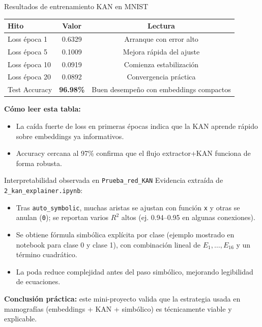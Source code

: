 \documentclass[aspectratio=169,spanish]{beamer}
\begin{document}
\begin{frame}{Resultados de entrenamiento KAN en MNIST}
  \small
  \begin{tabular}{@{}lcc@{}}
    \toprule
    Hito & Valor & Lectura \\
    \midrule
    Loss época 1  & 0.6329 & Arranque con error alto \\
    Loss época 5  & 0.1009 & Mejora rápida del ajuste \\
    Loss época 10 & 0.0919 & Comienza estabilización \\
    Loss época 20 & 0.0892 & Convergencia práctica \\
    Test Accuracy & \textbf{96.98\%} & Buen desempeño con embeddings compactos \\
    \bottomrule
  \end{tabular}

  \vspace{0.7em}
  \textbf{Cómo leer esta tabla:}
  \begin{itemize}
    \item La caída fuerte de loss en primeras épocas indica que la KAN aprende rápido sobre embeddings ya informativos.
    \item Accuracy cercana al 97\% confirma que el flujo extractor+KAN funciona de forma robusta.
  \end{itemize}
\end{frame}

\begin{frame}{Interpretabilidad observada en \texttt{Prueba\_red\_KAN}}
  \small
  Evidencia extraída de \texttt{2\_kan\_explainer.ipynb}:
  \begin{itemize}
    \item Tras \texttt{auto\_symbolic}, muchas aristas se ajustan con función \texttt{x} y otras se anulan (\texttt{0}); se reportan varios $R^2$ altos (ej. 0.94--0.95 en algunas conexiones).
    \item Se obtiene fórmula simbólica explícita por clase (ejemplo mostrado en notebook para clase 0 y clase 1), con combinación lineal de \(E_1,\dots,E_{16}\) y un término cuadrático.
    \item La poda reduce complejidad antes del paso simbólico, mejorando legibilidad de ecuaciones.
  \end{itemize}

  \vspace{0.5em}
  \textbf{Conclusión práctica:} este mini-proyecto valida que la estrategia usada en mamografías (embeddings + KAN + simbólico) es técnicamente viable y explicable.
\end{frame}
\end{document}
